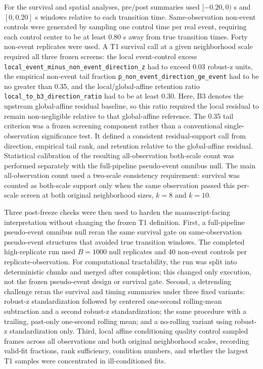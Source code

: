 For the survival and spatial analyses, pre/post summaries used
$[-0.20,0)$ s and $[0,0.20]$ s windows relative to each transition time.
Same-observation non-event controls were generated by sampling one control
time per real event, requiring each control center to be at least 0.80 s away
from true transition times. Forty non-event replicates were used. A T1
survival call at a given neighborhood scale required all three frozen screens:
the local event-control excess
\texttt{local\_event\_minus\_non\_event\_direction\_z} had to exceed 0.03
robust-z units, the empirical non-event tail fraction
\texttt{p\_non\_event\_direction\_ge\_event} had to be no greater than 0.35,
and the local/global-affine retention ratio
\texttt{local\_to\_b3\_direction\_ratio} had to be at least 0.30.
Here, B3 denotes the upstream global-affine residual baseline, so this ratio
required the local residual to remain non-negligible relative to that
global-affine reference. The 0.35 tail criterion was a frozen screening
component rather than a conventional single-observation significance test. It
defined a consistent residual-support call from direction, empirical tail
rank, and retention relative to the global-affine residual. Statistical
calibration of the resulting all-observation both-scale count was performed
separately with the full-pipeline pseudo-event omnibus null.
The main all-observation count used a two-scale consistency requirement:
survival was counted as both-scale support only when the same observation
passed this per-scale screen at both original neighborhood sizes, $k=8$ and
$k=10$.

Three post-freeze checks were then used to harden the manuscript-facing
interpretation without changing the frozen T1 definition. First, a
full-pipeline pseudo-event omnibus null reran the same survival gate on
same-observation pseudo-event structures that avoided true transition windows.
The completed high-replicate run used $B=1000$ null replicates and 40
non-event controls per replicate-observation. For computational tractability,
the run was split into deterministic chunks and merged after completion; this
changed only execution, not the frozen pseudo-event design or survival gate.
Second, a detrending challenge reran the survival and timing summaries under
three fixed variants: robust-z standardization followed by centered one-second
rolling-mean subtraction and a second robust-z standardization; the same
procedure with a trailing, past-only one-second rolling mean; and a no-rolling
variant using robust-z standardization only. Third, local affine conditioning
quality control sampled frames across all observations and both original
neighborhood scales, recording valid-fit fractions, rank sufficiency,
condition numbers, and whether the largest T1 samples were concentrated in
ill-conditioned fits.

